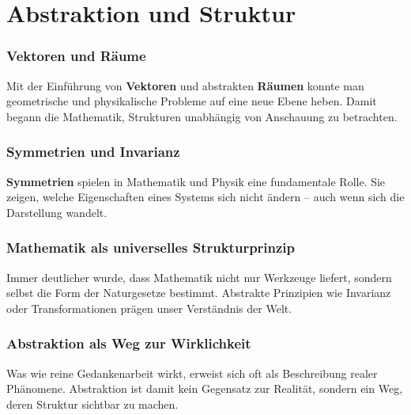 \chapter{Abstraktion und Struktur}
\label{chap:VI_abstraktion}

\setcounter{section}{6}
\setcounter{subsection}{0}
\setcounter{subsubsection}{1}
\setcounter{secnumdepth}{3}


\subsection{Vektoren und Räume}
Mit der Einführung von \textbf{Vektoren} und abstrakten \textbf{Räumen} 
konnte man geometrische und physikalische Probleme auf eine neue Ebene heben. 
Damit begann die Mathematik, Strukturen unabhängig von Anschauung zu betrachten. 

\subsection{Symmetrien und Invarianz}
\textbf{Symmetrien} spielen in Mathematik und Physik eine fundamentale Rolle. 
Sie zeigen, welche Eigenschaften eines Systems sich nicht ändern – auch wenn sich die Darstellung wandelt. 

\subsection{Mathematik als universelles Strukturprinzip}
Immer deutlicher wurde, dass Mathematik nicht nur Werkzeuge liefert, 
sondern selbst die Form der Naturgesetze bestimmt. 
Abstrakte Prinzipien wie Invarianz oder Transformationen prägen unser Verständnis der Welt. 

\subsection{Abstraktion als Weg zur Wirklichkeit}
Was wie reine Gedankenarbeit wirkt, erweist sich oft als Beschreibung realer Phänomene. 
Abstraktion ist damit kein Gegensatz zur Realität, 
sondern ein Weg, deren Struktur sichtbar zu machen. 
